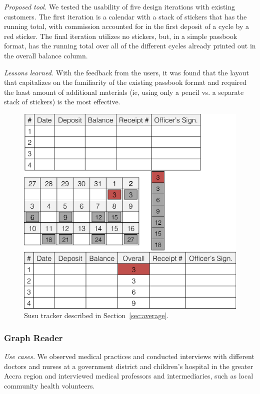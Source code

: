 \documentclass{sig-alternate}
\begin{document}
\emph{Proposed tool.}
We tested the usability of five design iterations with existing customers. 
The first iteration is a calendar with a stack of stickers that has the running total, with commission accounted for in the first deposit of a cycle by a red sticker. The final iteration utilizes no stickers, but, in a simple passbook format, has the running total over all of the different cycles already printed out in the overall balance column. 

\emph{Lessons learned.}
With the feedback from the users, it was found that the layout that capitalizes on the familiarity of the existing passbook format and required the laast amount of additional materials (ie, using only a pencil vs. a separate stack of stickers) is the most effective.


\begin{figure}
\centering
\includegraphics[width=.8\linewidth]{img/susu.png}
\caption{Susu tracker described in Section~\ref{sec:average}.}
\label{fig:average}
\end{figure}

\subsubsection{Graph Reader}
\label{sec:graph}

\emph{Use cases.}
We observed medical practices and conducted interviews with different doctors and nurses at a government district and children's hospital in the greater Accra region and interviewed medical professors and intermediaries, such as local community health volunteers. 
\end{document}
